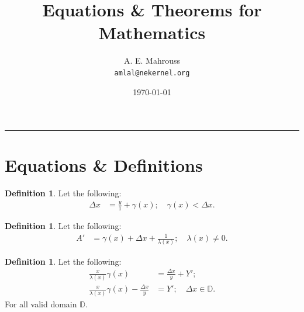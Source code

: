 \documentclass[10pt]{article}
\title{%
  \vspace{-1.5em}%
  \large\textbf{Equations \& Theorems for Mathematics}%
}
\author{A. E. Mahrouss\\\texttt{amlal@nekernel.org}}
\date{\today}
\theoremstyle{plain}
\theoremstyle{definition}
\newtheorem{definition}[theorem]{Definition}
\theoremstyle{remark}
\begin{document}
  \maketitle
\vspace{-0.5em}
\vspace{0.8em}
\rule{\linewidth}{0.4pt}
\vspace{1em}
\section{Equations \& Definitions}

\begin{definition}
	Let the following:
	\begin{align*}
	\Delta x &=	\frac{y}{1} + \gamma(x); \quad \gamma(x) < \Delta x.
	\end{align*}
\end{definition}

\begin{definition}
	Let the following:
	\begin{align*}
		A' &= \gamma(x)+\Delta x + \frac{1}{\lambda(x)}; \quad \lambda(x) \neq 0.
	\end{align*}
\end{definition}

\begin{definition}
	Let the following:
	\begin{align*}
		\frac{x}{\lambda(x)} \gamma(x) &= \frac{\Delta x}{y} + Y';\\
		\frac{x}{\lambda(x)} \gamma(x) - \frac{\Delta x}{y} &= Y'; \quad \Delta x \in \mathbb{D}.
	\end{align*}
	For all valid domain $\mathbb{D}$.
\end{definition}

\nocite{*}



\end{document}
